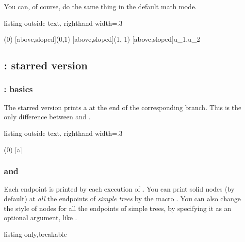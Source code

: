 You can, of course, do the same thing in the default math mode.

\begin{tcblisting}{listing outside text, righthand width=.3\linewidth}
\begin{istgame}[font=\footnotesize]
\istroot(0)
  [above,sloped]{(0,1)}
  [above,sloped]{(1,-1)}
  [above,sloped]{u_1,u_2}
  \endist
\end{istgame}
\end{tcblisting}


\subsection{\protect\cmd{\istb*}: starred version}
\label{ssec:istbstar}

\subsubsection{\protect\cmd{\istb*}: basics}

The starred version \icmd{\istb*} prints a  at the end of the corresponding branch. 
This is the only difference between \cmd{\istb} and \cmd{\istb*}.

\begin{tcblisting}{listing outside text, righthand width=.3\linewidth}
\begin{istgame}
\istroot[east](0)
  \istb*[draw=blue,thick]{\beta}[a]
  \endist
\end{istgame}
\end{tcblisting}

\subsubsection{\protect\cmd{\xtShowEndPoints} and \protect\cmd{\xtHideEndPoints}}
\label{page:endpoint}

Each endpoint is printed by each execution of \cmd{\istb*}.
You can print solid nodes (by default) at \emph{all} the endpoints of \emph{simple trees} by the macro \icmd{\xtShowEndPoints}.
You can also change the style of nodes for all the endpoints of simple trees, by specifying it as an optional argument, like .

\begin{tcblisting}{listing only,breakable}
\end{tcblisting}

